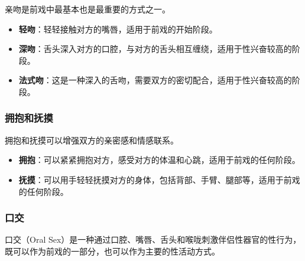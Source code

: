 \documentclass[12pt,UTF8]{ctexbook}
\begin{document}
亲吻是前戏中最基本也是最重要的方式之一。

\begin{itemize}
\item \textbf{轻吻}：轻轻接触对方的嘴唇，适用于前戏的开始阶段。
\item \textbf{深吻}：舌头深入对方的口腔，与对方的舌头相互缠绕，适用于性兴奋较高的阶段。
\item \textbf{法式吻}：这是一种深入的舌吻，需要双方的密切配合，适用于性兴奋较高的阶段。
\end{itemize}

\subsubsection{拥抱和抚摸}

拥抱和抚摸可以增强双方的亲密感和情感联系。

\begin{itemize}
\item \textbf{拥抱}：可以紧紧拥抱对方，感受对方的体温和心跳，适用于前戏的任何阶段。
\item \textbf{抚摸}：可以用手轻轻抚摸对方的身体，包括背部、手臂、腿部等，适用于前戏的任何阶段。
\end{itemize}

\subsubsection{口交}

口交（Oral Sex）是一种通过口腔、嘴唇、舌头和喉咙刺激伴侣性器官的性行为，既可以作为前戏的一部分，也可以作为主要的性活动方式。
\end{document}
